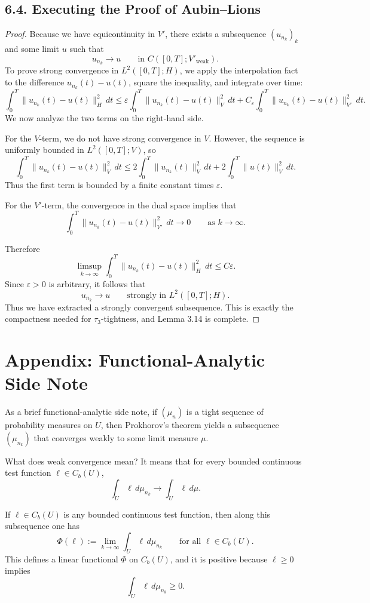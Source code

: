 \documentclass[11pt]{article}
\theoremstyle{definition}
\theoremstyle{remark}
\begin{document}
\subsection*{6.4. Executing the Proof of Aubin--Lions}
\begin{proof}
Because we have equicontinuity in $V'$, there exists a subsequence $(u_{n_k})_k$ and some limit $u$ such that
\[
  u_{n_k}\to u
  \qquad \text{in } C([0,T];V'_{\mathrm{weak}}).
\]
To prove strong convergence in $L^2([0,T];H)$, we apply the interpolation fact to the difference $u_{n_k}(t)-u(t)$, square the inequality, and integrate over time:
\[
\int_0^T \|u_{n_k}(t)-u(t)\|_H^2\,dt
\le
\varepsilon \int_0^T \|u_{n_k}(t)-u(t)\|_V^2\,dt
+
C_\varepsilon \int_0^T \|u_{n_k}(t)-u(t)\|_{V'}^2\,dt.
\]
We now analyze the two terms on the right-hand side.

For the $V$-term, we do not have strong convergence in $V$. However, the sequence is uniformly bounded in $L^2([0,T];V)$, so
\[
  \int_0^T \|u_{n_k}(t)-u(t)\|_V^2\,dt
  \le
  2\int_0^T \|u_{n_k}(t)\|_V^2\,dt
  +
  2\int_0^T \|u(t)\|_V^2\,dt.
\]
Thus the first term is bounded by a finite constant times $\varepsilon$.

For the $V'$-term, the convergence in the dual space implies that
\[
  \int_0^T \|u_{n_k}(t)-u(t)\|_{V'}^2\,dt\to 0
  \qquad \text{as } k\to\infty.
\]

Therefore
\[
  \limsup_{k\to\infty}
  \int_0^T \|u_{n_k}(t)-u(t)\|_H^2\,dt
  \le
  C\varepsilon.
\]
Since $\varepsilon>0$ is arbitrary, it follows that
\[
  u_{n_k}\to u
  \qquad \text{strongly in } L^2([0,T];H).
\]
Thus we have extracted a strongly convergent subsequence. This is exactly the compactness needed for $\tau_3$-tightness, and Lemma 3.14 is complete.
\end{proof}

\section*{Appendix: Functional-Analytic Side Note}
As a brief functional-analytic side note, if $(\mu_n)$ is a tight sequence of probability measures on $U$, then Prokhorov's theorem yields a subsequence $(\mu_{n_k})$ that converges weakly to some limit measure $\mu$.

What does weak convergence mean? It means that for every bounded continuous test function $\ell\in C_b(U)$,
\[
  \int_U \ell\,d\mu_{n_k}\to \int_U \ell\,d\mu.
\]

If $\ell\in C_b(U)$ is any bounded continuous test function, then along this subsequence one has
\[
  \Phi(\ell):=\lim_{k\to\infty}\int_U \ell\,d\mu_{n_k}
  \qquad \text{for all } \ell\in C_b(U).
\]
This defines a linear functional $\Phi$ on $C_b(U)$, and it is positive because $\ell\ge 0$ implies
\[
  \int_U \ell\,d\mu_{n_k}\ge 0.
\]
\end{document}
